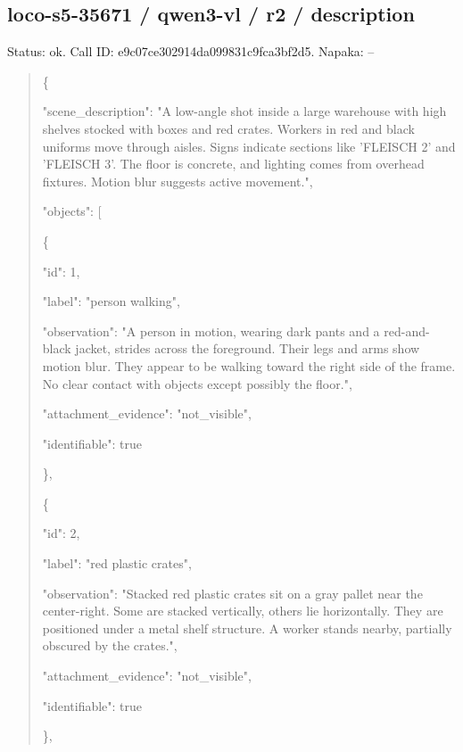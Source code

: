\documentclass[10pt,a4paper]{article}
\begin{document}
\subsection*{loco-s5-35671 / qwen3-vl / r2 / description}
Status: ok. Call ID: e9c07ce302914da099831c9fca3bf2d5. Napaka: --
\begin{quote}\footnotesize
\{\par
  "scene\_description":\allowbreak{} "A low-angle shot inside a large warehouse with high shelves stocked with boxes and red crates. Workers in red and black uniforms move through aisles. Signs indicate sections like 'FLEISCH 2' and 'FLEISCH 3'. The floor is concrete,\allowbreak{} and lighting comes from overhead fixtures. Motion blur suggests active movement.",\allowbreak{}\par
  "objects":\allowbreak{} [\par
    \{\par
      "id":\allowbreak{} 1,\allowbreak{}\par
      "label":\allowbreak{} "person walking",\allowbreak{}\par
      "observation":\allowbreak{} "A person in motion,\allowbreak{} wearing dark pants and a red-and-black jacket,\allowbreak{} strides across the foreground. Their legs and arms show motion blur. They appear to be walking toward the right side of the frame. No clear contact with objects except possibly the floor.",\allowbreak{}\par
      "attachment\_evidence":\allowbreak{} "not\_visible",\allowbreak{}\par
      "identifiable":\allowbreak{} true\par
    \},\allowbreak{}\par
    \{\par
      "id":\allowbreak{} 2,\allowbreak{}\par
      "label":\allowbreak{} "red plastic crates",\allowbreak{}\par
      "observation":\allowbreak{} "Stacked red plastic crates sit on a gray pallet near the center-right. Some are stacked vertically,\allowbreak{} others lie horizontally. They are positioned under a metal shelf structure. A worker stands nearby,\allowbreak{} partially obscured by the crates.",\allowbreak{}\par
      "attachment\_evidence":\allowbreak{} "not\_visible",\allowbreak{}\par
      "identifiable":\allowbreak{} true\par
    \},\allowbreak{}\par

\end{quote}
\end{document}
